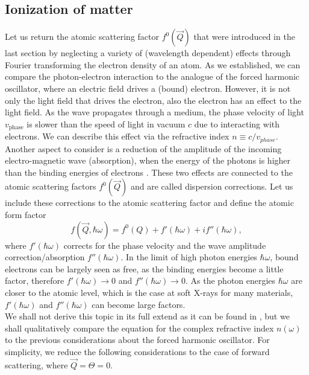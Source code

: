 \subsection{Ionization of matter}\label{sec:absorption}
Let us return the atomic scattering factor $f^{0}\left(\vec{Q}\right)$ that were introduced in the last section by neglecting a variety of (wavelength dependent) effects through Fourier transforming the electron density of an atom. As we established, we can compare the photon-electron interaction to the analogue of the forced harmonic oscillator, where an electric field drives a (bound) electron. However, it is not only the light field that drives the electron, also the electron has an effect to the light field. As the wave propagates through a medium, the phase velocity of light $v_{\text{phase}}$ is slower than the speed of light in vacuum $c$ due to interacting with electrons. We can describe this effect via the refractive index $n\equiv c/v_{phase}$. Another aspect to consider is a reduction of the amplitude of the incoming electro-magnetic wave (absorption), when the energy of the photons is higher than the binding energies of electrons \citep{Als-Nielson-2011-JWS,Attwood-2007-CUP}. These two effects are connected to the atomic scattering factors $f^{0}\left(\vec{Q}\right)$ and are called dispersion corrections. Let us include these corrections to the atomic scattering factor and define the atomic form factor
\begin{equation}
f\left(\vec{Q},\hbar\omega\right)=f^{0}\left(Q\right)+f'\left(\hbar\omega\right)+i f''\left(\hbar\omega\right),
\label{eq:scattering-factor-dispersion-corr}
\end{equation}
where $f'\left(\hbar\omega\right)$ corrects for the phase velocity and the wave amplitude correction/absorption $f''\left(\hbar\omega\right)$. In the limit of high photon energies $\hbar \omega$, bound electrons can be largely seen as free, as the binding energies become a little factor, therefore $f'\left(\hbar\omega\right)\rightarrow 0$ and $f''\left(\hbar\omega\right)\rightarrow 0$. As the photon energies $\hbar \omega$ are closer to the atomic level, which is the case at soft X-rays for many materials, $f'\left(\hbar\omega\right)$ and $f''\left(\hbar\omega\right)$ can become large factors.\\
We shall not derive this topic in its full extend as it can be found in \citep[][p. 55 ff]{Attwood-2007-CUP}, but we shall qualitatively compare the equation for the complex refractive index $n\left(\omega\right)$ to the previous considerations about the forced harmonic oscillator. For simplicity, we reduce the following considerations to the case of forward scattering, where $\vec{Q}=\Theta=0$.\\
